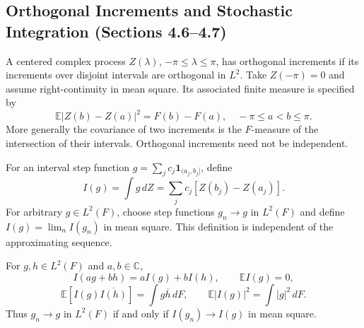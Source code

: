 \subsection{Orthogonal Increments and Stochastic Integration (Sections 4.6--4.7)}
\begin{definition}
A centered complex process $Z(\lambda)$, $-\pi\le\lambda\le\pi$, has
orthogonal increments if its increments over disjoint intervals are
orthogonal in $L^2$. Take $Z(-\pi)=0$ and assume right-continuity in mean
square. Its associated finite measure is specified by
\[
\mathbb E|Z(b)-Z(a)|^2=F(b)-F(a),\quad -\pi\le a<b\le\pi.
\]
More generally the covariance of two increments is the $F$-measure of the
intersection of their intervals. Orthogonal increments need not be independent.
\end{definition}
\begin{definition}
For an interval step function $g=\sum_j c_j\mathbf1_{(a_j,b_j]}$, define
\[
I(g)=\int g\,dZ=\sum_j c_j[Z(b_j)-Z(a_j)].
\]
For arbitrary $g\in L^2(F)$, choose step functions $g_n\to g$ in $L^2(F)$
and define $I(g)=\lim_n I(g_n)$ in mean square. This definition is independent
of the approximating sequence.
\end{definition}
\begin{theorem}[Isometry]
For $g,h\in L^2(F)$ and $a,b\in\mathbb C$,
\[
I(ag+bh)=aI(g)+bI(h),\qquad \mathbb EI(g)=0,
\]
\[
\mathbb E[I(g)\overline{I(h)}]=\int g\overline h\,dF,
\qquad \mathbb E|I(g)|^2=\int|g|^2\,dF.
\]
Thus $g_n\to g$ in $L^2(F)$ if and only if $I(g_n)\to I(g)$ in mean square.
\end{theorem}

